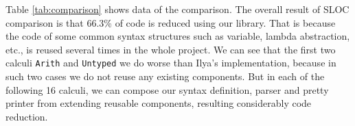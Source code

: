 Table \ref{tab:comparison} shows data of the comparison. The overall result of SLOC comparison is that 66.3\% of code is reduced using our library. That is because the code of some common syntax structures such as variable, lambda abstraction, etc., is reused several times in the whole project. We can see that the first two calculi \lstinline{Arith} and \lstinline{Untyped} we do worse than Ilya's implementation, because in such two cases we do not reuse any existing components. But in each of the following 16 calculi, we can compose our syntax definition, parser and pretty printer from extending reusable components, resulting considerably code reduction.
